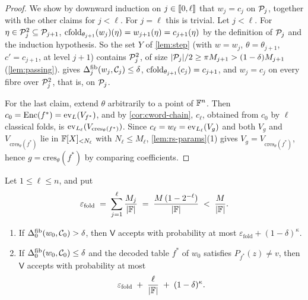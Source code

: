 \begin{proof}
We show by downward induction on $j \in \llbracket 0, \ell \rrbracket$ that $w_j = c_j$ on $\mathcal{P}_j$, together with the other claims for $j < \ell$. For $j = \ell$ this is trivial.
Let $j < \ell$. For $\eta \in \mathcal{P}_j^2 \subseteq \mathcal{P}_{j+1}$, $\mathrm{cfold}_{\theta_{j+1}}(w_j)(\eta) = w_{j+1}(\eta) = c_{j+1}(\eta)$ by the definition of $\mathcal{P}_j$ and the induction hypothesis.
So the set $Y$ of \cref{lem:step} (with $w = w_j$, $\theta = \theta_{j+1}$, $c' = c_{j+1}$, at level $j+1$) contains $\mathcal{P}_j^2$, of size $|\mathcal{P}_j|/2 \ge \pi M_{j+1} > (1-\delta)M_{j+1}$ (\cref{lem:passing}).
 gives $\Delta^{\mathrm{fib}}_j(w_j,\mathcal{C}_j) \le \delta$, $\mathrm{cfold}_{\theta_{j+1}}(c_j) = c_{j+1}$, and $w_j = c_j$ on every fibre over $\mathcal{P}_j^2$, that is, on $\mathcal{P}_j$.

For the last claim, extend $\theta$ arbitrarily to a point of $\mathbb{F}^n$. Then $c_0 = \mathrm{Enc}(f^*) = \mathrm{ev}_L(V_{f^*})$, and by \cref{cor:cword-chain}, $c_\ell$, obtained from $c_0$ by $\ell$ classical folds, is $\mathrm{ev}_{L_\ell}(V_{\mathrm{cres}_\theta(f^*)})$.
Since $c_\ell = w_\ell = \mathrm{ev}_{L_\ell}(V_g)$ and both $V_g$ and $V_{\mathrm{cres}_\theta(f^*)}$ lie in $\mathbb{F}[X]_{<N_\ell}$ with $N_\ell \le M_\ell$, \cref{lem:rs-params}(1) gives $V_g = V_{\mathrm{cres}_\theta(f^*)}$, hence $g = \mathrm{cres}_\theta(f^*)$ by comparing coefficients.
\end{proof}

\begin{theorem}[Soundness]\label{thm:sound}
Let $1 \le \ell \le n$, and put
\[
  \varepsilon_{\mathrm{fold}} \;=\; \sum_{j=1}^{\ell} \frac{M_j}{|\mathbb{F}|} \;=\; \frac{M\,(1 - 2^{-\ell})}{|\mathbb{F}|} \;<\; \frac{M}{|\mathbb{F}|}.
\]
\begin{enumerate}
  \item If $\Delta^{\mathrm{fib}}_0(w_0, \mathcal{C}_0) > \delta$, then $\mathsf{V}$ accepts with probability at most $\varepsilon_{\mathrm{fold}} + (1-\delta)^{\kappa}$.
  \item If $\Delta^{\mathrm{fib}}_0(w_0, \mathcal{C}_0) \le \delta$ and the decoded table $f^*$ of $w_0$ satisfies $P_{f^*}(z) \ne v$, then $\mathsf{V}$ accepts with probability at most
  \[
    \varepsilon_{\mathrm{fold}} \;+\; \frac{\ell}{|\mathbb{F}|} \;+\; (1-\delta)^{\kappa}.
  \]
\end{enumerate}
\end{theorem}


